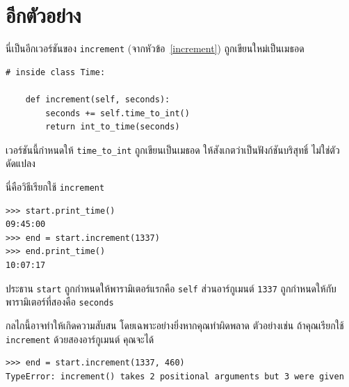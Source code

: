 \section{อีกตัวอย่าง} %


นี่เป็นอีกเวอร์ชันของ {\tt increment} (จากหัวข้อ~\ref{increment}) ถูกเขียนใหม่เป็นเมธอด

\begin{verbatim}
# inside class Time:

    def increment(self, seconds):
        seconds += self.time_to_int()
        return int_to_time(seconds)
\end{verbatim}
%

เวอร์ชันนี้กำหนดให้ \verb"time_to_int" ถูกเขียนเป็นเมธอด ให้สังเกตว่าเป็นฟังก์ชันบริสุทธิ์ ไม่ใช่ตัวดัดแปลง


นี่คือวิธีเรียกใช้ {\tt increment}

\begin{verbatim}
>>> start.print_time()
09:45:00
>>> end = start.increment(1337)
>>> end.print_time()
10:07:17
\end{verbatim}
%

ประธาน {\tt start} ถูกกำหนดให้พารามิเตอร์แรกคือ {\tt self} ส่วนอาร์กูเมนต์ {\tt 1337} ถูกกำหนดให้กับพารามิเตอร์ที่สองคือ {\tt seconds}


กลไกนี้อาจทำให้เกิดความสับสน โดยเฉพาะอย่างยิ่งหากคุณทำผิดพลาด ตัวอย่างเช่น ถ้าคุณเรียกใช้ {\tt increment} ด้วยสองอาร์กูเมนต์ คุณจะได้


\begin{verbatim}
>>> end = start.increment(1337, 460)
TypeError: increment() takes 2 positional arguments but 3 were given
\end{verbatim}
%

